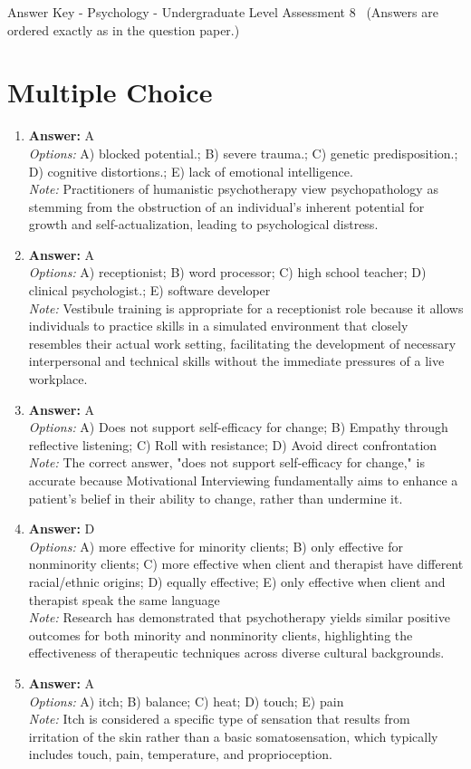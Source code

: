 \documentclass[12pt]{article}
\begin{document}
\begin{center}
Answer Key - Psychology - Undergraduate Level Assessment 8 \
\small (Answers are ordered exactly as in the question paper.)
\end{center}

\section*{Multiple Choice}
\begin{enumerate}[label=\arabic*.]
\item \textbf{Answer:} A
\\ \textit{Options:} A) blocked potential.; B) severe trauma.; C) genetic predisposition.; D) cognitive distortions.; E) lack of emotional intelligence.
\\ \textit{Note:} Practitioners of humanistic psychotherapy view psychopathology as stemming from the obstruction of an individual's inherent potential for growth and self-actualization, leading to psychological distress.
\item \textbf{Answer:} A
\\ \textit{Options:} A) receptionist; B) word processor; C) high school teacher; D) clinical psychologist.; E) software developer
\\ \textit{Note:} Vestibule training is appropriate for a receptionist role because it allows individuals to practice skills in a simulated environment that closely resembles their actual work setting, facilitating the development of necessary interpersonal and technical skills without the immediate pressures of a live workplace.
\item \textbf{Answer:} A
\\ \textit{Options:} A) Does not support self-efficacy for change; B) Empathy through reflective listening; C) Roll with resistance; D) Avoid direct confrontation
\\ \textit{Note:} The correct answer, "does not support self-efficacy for change," is accurate because Motivational Interviewing fundamentally aims to enhance a patient's belief in their ability to change, rather than undermine it.
\item \textbf{Answer:} D
\\ \textit{Options:} A) more effective for minority clients; B) only effective for nonminority clients; C) more effective when client and therapist have different racial/ethnic origins; D) equally effective; E) only effective when client and therapist speak the same language
\\ \textit{Note:} Research has demonstrated that psychotherapy yields similar positive outcomes for both minority and nonminority clients, highlighting the effectiveness of therapeutic techniques across diverse cultural backgrounds.
\item \textbf{Answer:} A
\\ \textit{Options:} A) itch; B) balance; C) heat; D) touch; E) pain
\\ \textit{Note:} Itch is considered a specific type of sensation that results from irritation of the skin rather than a basic somatosensation, which typically includes touch, pain, temperature, and proprioception.
\end{enumerate}
\end{document}
